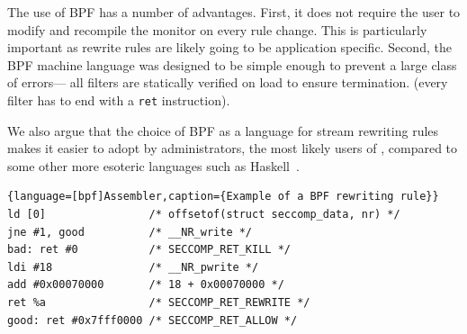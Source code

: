 The use of BPF has a number of advantages.  First, it does not require
the user to modify and recompile the monitor on every rule
change. This is particularly important as rewrite rules are likely
going to be application specific. Second, the BPF machine language was
designed to be simple enough to prevent a large class of errors---\eg
all filters are statically verified on load to ensure termination.
(\ie every filter has to end with a \lstinline`ret` instruction).

We also argue that the choice of BPF as a language for stream rewriting rules
makes it easier to adopt by administrators, the most likely users of \vx,
compared to some other more esoteric languages such as Haskell~\cite{tachyon12}.

\begin{lstlisting}{language=[bpf]Assembler,caption={Example of a BPF rewriting rule}}
ld [0]                /* offsetof(struct seccomp_data, nr) */
jne #1, good          /* __NR_write */
bad: ret #0           /* SECCOMP_RET_KILL */
ldi #18               /* __NR_pwrite */
add #0x00070000       /* 18 + 0x00070000 */
ret %a                /* SECCOMP_RET_REWRITE */
good: ret #0x7fff0000 /* SECCOMP_RET_ALLOW */
\end{lstlisting}
